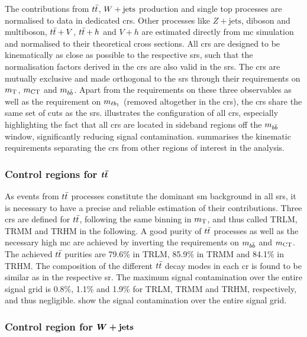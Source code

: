 The contributions from $\ttbar$, $\wjets$ production and single top processes are normalised to data in dedicated \glspl{cr}. Other processes like $Z+\mathrm{jets}$, diboson and multiboson, $t\bar{t}+V$, $t\bar{t}+h$ and $V+h$ are estimated directly from \gls{mc} simulation and normalised to their theoretical cross sections. All \glspl{cr} are designed to be kinematically as close as possible to the respective \glspl{sr}, such that the normalisation factors derived in the \glspl{cr} are also valid in the \glspl{sr}. The \glspl{cr} are mutually exclusive and made orthogonal to the \glspl{sr} through their requirements on $m_{\textrm{T}}$, $m_{\textrm{CT}}$ and $m_{b\bar{b}}$. Apart from the requirements on these three observables as well as the requirement on $m_{\ell b_{1}}$ (removed altogether in the \glspl{cr}), the \glspl{cr} share the same set of cuts as the \glspl{sr}.  illustrates the configuration of all \glspl{cr}, especially highlighting the fact that all \glspl{cr} are located in sideband regions off the $m_{b\bar{b}}$ window, significantly reducing signal contamination.  summarises the kinematic requirements separating the \glspl{cr} from other regions of interest in the analysis. 

\subsubsection[Control regions for $\ttbar$]{Control regions for $\boldsymbol{t\bar{t}}$}

As events from $\ttbar$ processes constitute the dominant \gls{sm} background in all \glspl{sr}, it is necessary to have a precise and reliable estimation of their contributions. Three \glspl{cr} are defined for $\ttbar$, following the same binning in $m_{\textrm{T}}$, and thus called TRLM, TRMM and TRHM in the following. A good purity of $\ttbar$ processes as well as the necessary high \gls{mc} are achieved  by inverting the requirements on $m_{b\bar{b}}$ and $m_{\textrm{CT}}$. The achieved $\ttbar$ purities are 79.6\% in TRLM, 85.9\% in TRMM and 84.1\% in TRHM. The composition of the different $\ttbar$ decay modes in each \gls{cr} is found to be similar as in the respective \gls{sr}. The maximum signal contamination over the entire signal grid is 0.8\%, 1.1\% and 1.9\% for TRLM, TRMM and TRHM, respectively, and thus negligible.  show the signal contamination over the entire signal grid. 

\subsubsection[Control region for $\wjets$]{Control region for $\boldsymbol{W+\mathrm{jets}}$}

